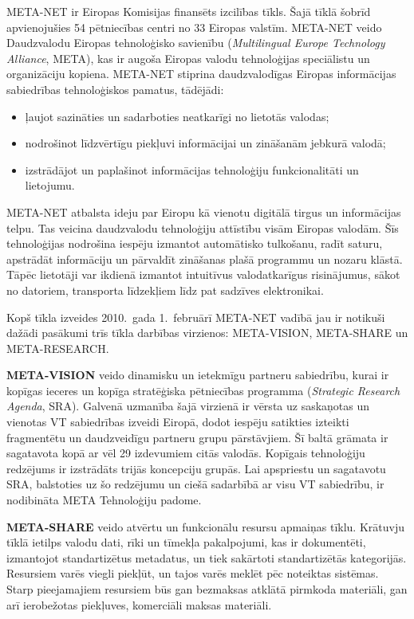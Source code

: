 \begin{multicols}{2} 

META-NET ir Eiropas Komisijas finansēts izcilības tīkls.  Šajā tīklā šobrīd apvienojušies 54 pētniecības centri no 33 Eiropas valstīm.  META-NET veido Daudzvalodu Eiropas tehnoloģisko savienību (\textit{Multilingual Europe Technology Alliance}, META), kas ir augoša Eiropas valodu tehnoloģijas speciālistu un organizāciju kopiena.  META-NET stiprina daudzvalodīgas Eiropas informācijas sabiedrības tehnoloģiskos pamatus, tādējādi:

\begin{itemize}
\item ļaujot sazināties un sadarboties neatkarīgi no lietotās valodas;
\item nodrošinot līdzvērtīgu piekļuvi informācijai un zināšanām jebkurā valodā; 
\item izstrādājot un paplašinot informācijas tehnoloģiju funkcionalitāti un lietojumu.
\end{itemize}

META-NET atbalsta ideju par Eiropu kā vienotu digitālā tirgus un informācijas telpu. 
Tas veicina daudzvalodu tehnoloģiju attīstību visām Eiropas valodām. 
Šīs tehnoloģijas nodrošina iespēju izmantot automātisko tulkošanu, radīt saturu, apstrādāt informāciju un pārvaldīt zināšanas plašā programmu un nozaru klāstā. 
Tāpēc lietotāji var ikdienā izmantot intuitīvus valodatkarīgus risinājumus, sākot no datoriem, transporta līdzekļiem līdz pat sadzīves elektronikai. 

Kopš tīkla izveides 2010.~gada 1.~februārī META-NET vadībā jau ir notikuši dažādi pasākumi trīs tīkla darbības virzienos: META-VISION, META-SHARE un META-RESEARCH. 

\textbf{META-VISION} veido dinamisku un ietekmīgu part\-neru sabiedrību, kurai ir kopīgas ieceres un kopīga stratēģiska pētniecības programma (\textit{Strategic Research Agenda}, SRA).  Galvenā uzmanība šajā virzienā ir vērsta uz saskaņotas un vienotas VT sabiedrības izveidi Eiropā, dodot iespēju satikties izteikti fragmentētu un daudzveidīgu partneru grupu pārstāvjiem.  Šī baltā grāmata ir sagatavota kopā ar vēl 29 izdevumiem citās valodās.  Kopīgais tehnoloģiju redzējums ir izstrādāts trijās koncepciju grupās.  Lai apspriestu un sagatavotu SRA, balstoties uz šo redzējumu un ciešā sadarbībā ar visu VT sabiedrību, ir nodibināta META Tehnoloģiju padome.

\textbf{META-SHARE} veido atvērtu un funkcionālu resursu apmaiņas tīklu. 
Krātuvju tīklā ietilps valodu dati, rīki un tīmekļa pakalpojumi, kas ir dokumentēti, izmantojot standartizētus metadatus, un tiek sakārtoti standartizētās kategorijās. 
Resursiem varēs viegli piekļūt, un tajos varēs meklēt pēc noteiktas sistēmas. 
Starp pieejamajiem resursiem būs gan bezmaksas atklātā pirmkoda materiāli, gan arī ierobežotas piekļuves, komerciāli maksas materiāli.


\end{multicols}

